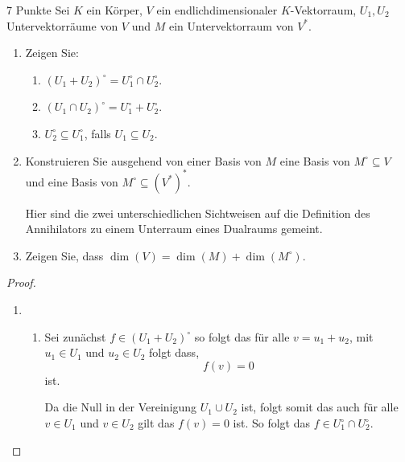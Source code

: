\documentclass{problemset}
\author{Michael van Straten}
\begin{document}
\maketitle

\begin{problem}{7 Punkte}
Sei $K$ ein Körper, $V$ ein endlichdimensionaler $K$-Vektorraum, $U_1, U_2$
Untervektorräume von $V$ und $M$ ein Untervektorraum von $V^*$.
\begin{enumerate}
    \item Zeigen Sie:
          \begin{enumerate}
              \item $(U_1 + U_2)^\circ = U_1^\circ \cap U_2^\circ$.
              \item $(U_1 \cap U_2)^\circ = U_1^\circ + U_2^\circ$.
              \item $U_2^\circ \subseteq U_1^\circ$, falls $U_1 \subseteq U_2$.
          \end{enumerate}
    \item Konstruieren Sie ausgehend von einer Basis von $M$ eine Basis von
          $M^\circ \subseteq V$ und eine Basis von $M^\circ \subseteq (V^*)^*$.
          \begin{hint}
              Hier sind die zwei unterschiedlichen Sichtweisen auf die Definition des
              Annihilators zu einem Unterraum eines Dualraums gemeint.
          \end{hint}
    \item Zeigen Sie, dass $\dim(V) = \dim(M) + \dim(M^\circ)$.
\end{enumerate}

\begin{proof}
    \leavevmode
    \begin{enumerate}
        \item
              \leavevmode
              \begin{enumerate}
                  \item Sei zunächst \(f \in (U_1 + U_2)^\circ\) so folgt das
                        für alle \(v = u_1 + u_2\), mit \(u_1 \in U_1\) und
                        \(u_2 \in U_2\) folgt dass,
                        \begin{equation}
                            f(v) = 0
                        \end{equation} ist.

                        Da die Null in der Vereinigung \(U_1 \cup U_2\) ist,
                        folgt somit das auch für alle \(v \in U_1\) und \(v \in
                        U_2\) gilt das \(f(v) = 0\) ist. So folgt das \(f \in
                        U_1^\circ \cap U_2^\circ\).


\end{enumerate}
\end{enumerate}
\end{proof}
\end{problem}
\end{document}
